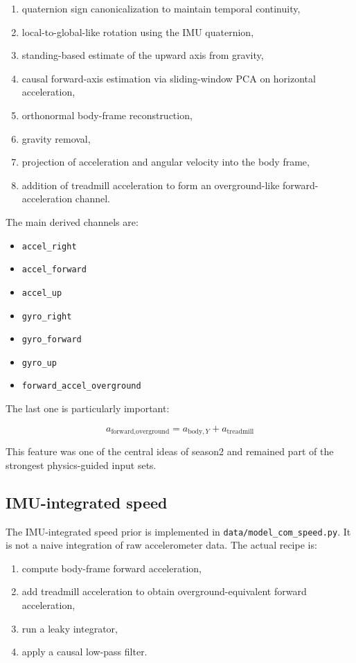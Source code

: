 \documentclass[11pt,a4paper]{article}
\begin{document}
\begin{enumerate}
\item quaternion sign canonicalization to maintain temporal continuity,
\item local-to-global-like rotation using the IMU quaternion,
\item standing-based estimate of the upward axis from gravity,
\item causal forward-axis estimation via sliding-window PCA on horizontal acceleration,
\item orthonormal body-frame reconstruction,
\item gravity removal,
\item projection of acceleration and angular velocity into the body frame,
\item addition of treadmill acceleration to form an overground-like forward-acceleration channel.
\end{enumerate}

The main derived channels are:

\begin{itemize}
\item \texttt{accel\_right}
\item \texttt{accel\_forward}
\item \texttt{accel\_up}
\item \texttt{gyro\_right}
\item \texttt{gyro\_forward}
\item \texttt{gyro\_up}
\item \texttt{forward\_accel\_overground}
\end{itemize}

The last one is particularly important:

\[
a_{\text{forward,overground}} = a_{\text{body},Y} + a_{\text{treadmill}}
\]

This feature was one of the central ideas of season2 and remained part of the strongest physics-guided input sets.

\subsection{IMU-integrated speed}

The IMU-integrated speed prior is implemented in \texttt{data/model\_com\_speed.py}. It is not a naive integration of raw accelerometer data. The actual recipe is:

\begin{enumerate}
\item compute body-frame forward acceleration,
\item add treadmill acceleration to obtain overground-equivalent forward acceleration,
\item run a leaky integrator,
\item apply a causal low-pass filter.
\end{enumerate}
\end{document}
